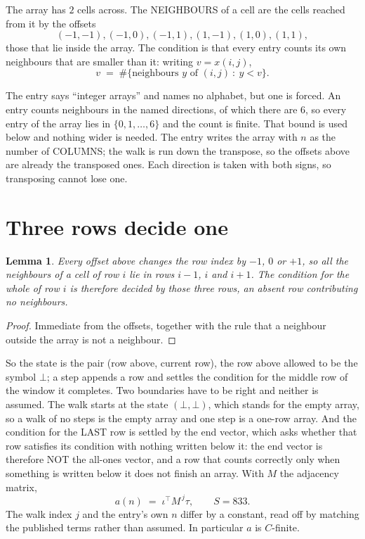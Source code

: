 \documentclass[11pt,a4paper]{article}
\theoremstyle{plain}
\newtheorem{lemma}[theorem]{Lemma}
\theoremstyle{definition}
\begin{document}
The array has $2$ cells across. The NEIGHBOURS of a cell are the cells reached from it by the
offsets
\[
(-1,-1), (-1,0), (-1,1), (1,-1), (1,0), (1,1),
\]
those that lie inside the array. The condition is that every entry counts its own neighbours
that are smaller than it: writing $v=x(i,j)$,
\[
v\;=\;\#\{\text{neighbours } y \text{ of } (i,j)\ :\ y<v\} .
\]

The entry says ``integer arrays'' and names no alphabet, but one is forced. An entry counts
neighbours in the named directions, of which there are $6$, so every entry of the array
lies in $\{0,1,\dots,6\}$ and the count is finite. That bound is used below and
nothing wider is needed. The entry writes the array with $n$ as the number of COLUMNS; the walk is run down the transpose, so the offsets above are already the transposed ones. Each direction is taken with both signs, so transposing cannot lose one.

\section{Three rows decide one}

\begin{lemma}\label{lem:win}
Every offset above changes the row index by $-1$, $0$ or $+1$, so all the neighbours of a cell
of row $i$ lie in rows $i-1$, $i$ and $i+1$. The condition for the whole of row $i$ is
therefore decided by those three rows, an absent row contributing no neighbours.
\end{lemma}

\begin{proof}
Immediate from the offsets, together with the rule that a neighbour outside the array is not a
neighbour.
\end{proof}

So the state is the pair (row above, current row), the row above allowed to be the symbol
$\bot$; a step appends a row and settles the condition for the middle row of the window it
completes. Two boundaries have to be right and neither is assumed. The walk starts at the state
$(\bot,\bot)$, which stands for the empty array, so a walk of no steps is the empty array and
one step is a one-row array. And the condition for the LAST row is settled by the end vector,
which asks whether that row satisfies its condition with nothing written below it: the end
vector is therefore NOT the all-ones vector, and a row that counts correctly only when
something is written below it does not finish an array. With $M$ the adjacency matrix,
\[
a(n)\;=\;\iota^{\!\top}M^{\,j}\tau ,\qquad S=833.
\]
The walk index $j$ and the entry's own $n$ differ by a constant, read off by matching the
published terms rather than assumed. In particular $a$ is $C$-finite.
\end{document}
